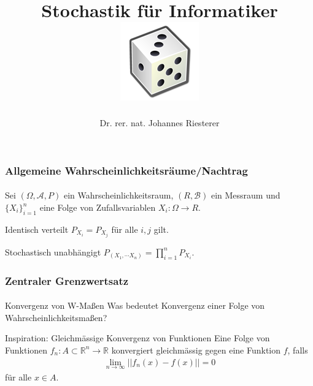 \documentclass{beamer}
\begin{document}
\title[Stochastik] %
{Stochastik für Informatiker
\\
\includegraphics[scale=0.5]{img/craps}
}
\subtitle{}
\author[Dr. Johannes Riesterer] %
{Dr.  rer. nat. Johannes Riesterer}

\date[KPT 2004] %
{}

\subject{Stochastik}

\frame{\titlepage}


\begin{frame}
    \frametitle{Allgemeine Wahrscheinlichkeitsräume/Nachtrag}
\framesubtitle{}

\begin{block}{}
Sei $(\Omega, \mathcal{A}, P)$ ein Wahrscheinlichkeitsraum, $(R, \mathcal{B})$ ein Messraum  und
 $\{X_i\}_{i=1}^n$ eine Folge von Zufallsvariablen   $X_i :  \Omega \to R$.
\end{block}
\begin{block}{Identisch verteilt}
 $P_{X_i} = P_{X_j}$ für alle $i,j$ gilt.
\end{block}
\begin{block}{Stochastisch unabhängigt}
 $P_{(X_1, \cdots X_n)} = \prod_{i=1}^n P_{X_i}$. 
\end{block}

 \end{frame}



\begin{frame}
    \frametitle{Zentraler Grenzwertsatz}
\framesubtitle{}

\begin{block}{Konvergenz von W-Maßen}
Was bedeutet Konvergenz einer Folge von Wahrscheinlichkeitsmaßen?
\end{block}
\begin{block}{Inspiration: Gleichmässige Konvergenz von Funktionen}
Eine Folge von Funktionen $f_n: A \subset \mathbb{R}^n \to \mathbb{R}$ konvergiert gleichmässig gegen eine Funktion $f$, falls 
\begin{align*}
\lim_{n \to \infty} ||f_n(x) -f(x) || = 0
\end{align*}
für alle $x \in A$.
\end{block}

 \end{frame}
\end{document}
